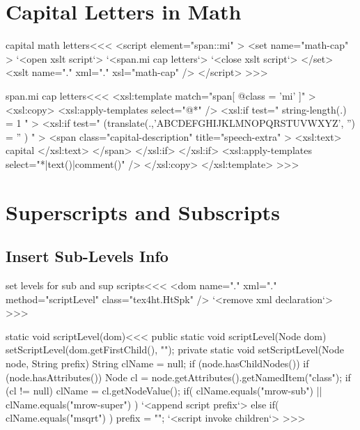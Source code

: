 \documentclass{article}
\begin{document}
\section{Capital Letters in Math}

\<capital math letters\><<<
<script element="span::mi" >
  <set name="math-cap" >
     `<open xslt script`>
     `<span.mi cap letters`> 
     `<close xslt script`>
  </set>
  <xslt name="." xml="." xsl="math-cap" />
</script> 
>>>


\<span.mi cap letters\><<<
<xsl:template match="span[ @class = 'mi' ]" >
  <xsl:copy>
    <xsl:apply-templates select="@*" />
      <xsl:if test=" string-length(.) = 1 " >      
         <xsl:if test="
                     (translate(.,'ABCDEFGHIJKLMNOPQRSTUVWXYZ',
                                  '') = '' )
                  " >      
            <span class="capital-description" 
                  title="speech-extra" >
               <xsl:text> capital </xsl:text>
            </span>
         </xsl:if>      
      </xsl:if>      
    <xsl:apply-templates select="*|text()|comment()" />
  </xsl:copy>
</xsl:template> 
>>>

\section{Superscripts and Subscripts}

\subsection{Insert Sub-Levels Info}




\<set levels for sub and sup scripts\><<<
<dom name="." xml="." method="scriptLevel" class="tex4ht.HtSpk" />
`<remove xml declaration`>
>>>



\<static void scriptLevel(dom)\><<<
public static void scriptLevel(Node dom) {
   setScriptLevel(dom.getFirstChild(), "");
}
private static void setScriptLevel(Node node, String prefix) {
  String clName = null;
  if (node.hasChildNodes()) {
    if (node.hasAttributes()) {
      Node cl = node.getAttributes().getNamedItem("class");
      if (cl != null) {
        clName = cl.getNodeValue();
        if( clName.equals("mrow-sub")
            ||
            clName.equals("mrow-super")
        ){
          `<append script prefix`>
        } else if( 
           clName.equals("msqrt")
        ){  prefix = ""; }
    } }
    `<script invoke children`>
} }
>>>
\end{document}
